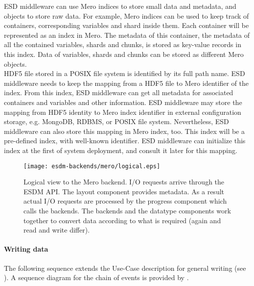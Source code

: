 ESD middleware can use Mero indices to store small data and metadata, and objects
to store raw data. For example, Mero indices can be used to keep track of
containers, corresponding variables and shard inside them. Each container will
be represented as an index in Mero. The metadata of this container, the metadata
of all the contained variables, shards and chunks, is stored as key-value records
in this index. Data of variables, shards and chunks can be stored as different
Mero objects. \\

HDF5 file stored in a POSIX file system is identified by its full path name.
ESD middleware needs to keep the mapping from a HDF5 file to Mero identifier of
the index. From this index, ESD middleware can get all metadata for associated
containers and variables and other information. ESD middleware may store the
mapping from HDF5 identity to Mero index identifier in external configuration
storage, e.g. MongoDB, RDBMS, or POSIX file system. Nevertheless, ESD middleware
can also store this mapping in Mero index, too. This index will be a pre-defined
index, with well-known identifier. ESD middleware can initialize this index
at the first of system deployment, and consult it later for this mapping.

\begin{figure}
	\centering
	\texttt{[image: esdm-backends/mero/logical.eps]}
	\caption{Logical view to the Mero backend. I/O requests arrive through the ESDM API. The layout component provides metadata. As a result actual I/O requests are processed by the progress component which calls the backends. The backends and the datatype components work together to convert data according to what is required (again and read and write differ).}
	\label{fig:mero backend logical view}
\end{figure}


\paragraph{Writing data}


The following sequence extends the Use-Case description for general writing
(see ).
A sequence diagram for the chain of events is provided by .

